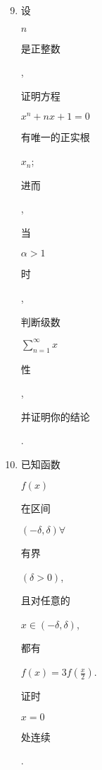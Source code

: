 \documentclass[10pt]{article}
\begin{document}
\begin{enumerate}
  \setcounter{enumi}{8}
  \item \begin{CJK}{UTF8}{mj}设\end{CJK} $n$ \begin{CJK}{UTF8}{mj}是正整数\end{CJK}, \begin{CJK}{UTF8}{mj}证明方程\end{CJK} $x^{n}+n x+1=0$ \begin{CJK}{UTF8}{mj}有唯一的正实根\end{CJK} $x_{n}$; \begin{CJK}{UTF8}{mj}进而\end{CJK}, \begin{CJK}{UTF8}{mj}当\end{CJK} $\alpha>1$ \begin{CJK}{UTF8}{mj}时\end{CJK}, \begin{CJK}{UTF8}{mj}判断级数\end{CJK} $\sum_{n=1}^{\infty} x$ \begin{CJK}{UTF8}{mj}性\end{CJK}, \begin{CJK}{UTF8}{mj}并证明你的结论\end{CJK}.

  \item \begin{CJK}{UTF8}{mj}已知函数\end{CJK} $f(x)$ \begin{CJK}{UTF8}{mj}在区间\end{CJK} $(-\delta, \delta) \forall$ \begin{CJK}{UTF8}{mj}有界\end{CJK} $(\delta>0)$, \begin{CJK}{UTF8}{mj}且对任意的\end{CJK} $x \in(-\delta, \delta)$, \begin{CJK}{UTF8}{mj}都有\end{CJK} $f(x)=3 f\left(\frac{x}{2}\right)$. \begin{CJK}{UTF8}{mj}证时\end{CJK} $x=0$ \begin{CJK}{UTF8}{mj}处连续\end{CJK}.


\end{enumerate}
\end{document}
